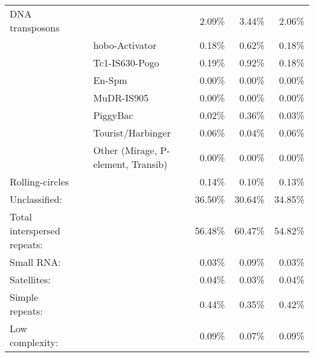 \begin{table}
\begin{tabular}{p{3cm}p{2.4cm}p{2.8cm}rrr}
		DNA transposons             &               &                                    &  2.09\% &  3.44\% &  2.06\% \\
		                            &               & hobo-Activator                     &  0.18\% &  0.62\% &  0.18\% \\
		                            &               & Tc1-IS630-Pogo                     &  0.19\% &  0.92\% &  0.18\% \\
		                            &               & En-Spm                             &  0.00\% &  0.00\% &  0.00\% \\
		                            &               & MuDR-IS905                         &  0.00\% &  0.00\% &  0.00\% \\
		                            &               & PiggyBac                           &  0.02\% &  0.36\% &  0.03\% \\
		                            &               & Tourist/Harbinger                  &  0.06\% &  0.04\% &  0.06\% \\
		                            &               & Other (Mirage, P-element, Transib) &  0.00\% &  0.00\% &  0.00\% \\
		Rolling-circles             &               &                                    &  0.14\% &  0.10\% &  0.13\% \\
		Unclassified:               &               &                                    & 36.50\% & 30.64\% & 34.85\% \\[3mm]
		Total interspersed repeats: &               &                                    & 56.48\% & 60.47\% & 54.82\% \\ \midrule
		Small RNA:                  &               &                                    &  0.03\% &  0.09\% &  0.03\% \\
		Satellites:                 &               &                                    &  0.04\% &  0.03\% &  0.04\% \\
		Simple repeats:             &               &                                    &  0.44\% &  0.35\% &  0.42\% \\
		Low complexity:             &               &                                    &  0.09\% &  0.07\% &  0.09\% \\ \bottomrule
	\end{tabular}
\end{table}